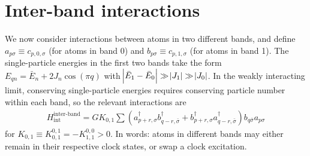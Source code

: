 \documentclass[aps,notitlepage,nofootinbib,11pt]{revtex4-1}
\renewcommand{\t}{\text} %
\newcommand{\p}[1]{\left(#1\right)} %
\newcommand{\1}{\mathds{1}}
\begin{document}
\section{Inter-band interactions}

We now consider interactions between atoms in two different bands, and
define $a_{p\sigma} \equiv c_{p,0,\sigma}$ (for atoms in band 0) and
$b_{p\sigma} \equiv c_{p,1,\sigma}$ (for atoms in band 1).  The
single-particle energies in the first two bands take the form
$E_{qn}=\bar E_n+2J_n\cos\p{\pi q}$ with
$\abs{\bar E_1-\bar E_0}\gg\abs{J_1}\gg\abs{J_0}$.  In the weakly
interacting limit, conserving single-particle energies requires
conserving particle number within each band, so the relevant
interactions are
\begin{align}
  H_{\t{int}}^{\t{inter-band}}
  = G K_{0,1} \sum
  \p{a_{p+r,\sigma}^\dag b_{q-r,\bar\sigma}^\dag
    + b_{p+r,\sigma}^\dag a_{q-r,\bar\sigma}^\dag}
  b_{q\bar\sigma} a_{p\sigma}
\end{align}
for $K_{0,1}\equiv K^{0,1}_{0,1}=-K^{0,0}_{1,1}>0$.  In words: atoms
in different bands may either remain in their respective clock states,
or swap a clock excitation.
\end{document}
